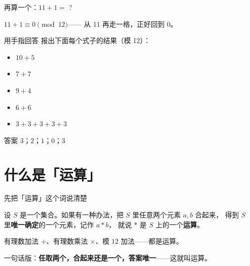 \documentclass[10pt]{beamer}
\begin{document}
\begin{frame}{再算一个：\(11+1=\) ?}
  \pause
  \begin{center}
    {\large \(11+1\equiv 0 \pmod{12}\)}\quad —— 从 11 再走一格，正好回到 0。
  \end{center}
\end{frame}

\begin{frame}{用手指回答}
  报出下面每个式子的结果（模 12）：
  \begin{itemize}
    \item \(10+5\)
    \item \(7+7\)
    \item \(9+4\)
    \item \(6+6\)
    \item \(3+3+3+3+3\)
  \end{itemize}
  \pause
  \begin{block}{答案}
    \(3\)；\quad \(2\)；\quad \(1\)；\quad \(0\)；\quad \(3\)
  \end{block}
\end{frame}

\section{什么是「运算」}

\begin{frame}{先把「运算」这个词说清楚}
  \begin{definition}[运算]
    设 \(S\) 是一个集合。如果有一种办法，把 \(S\) 里任意两个元素 \(a,b\) 合起来，
    得到 \(S\) 里\textbf{唯一确定}的一个元素，记作 \(a*b\)，
    就说 \(*\) 是 \(S\) 上的一个\textbf{运算}。
  \end{definition}
  \pause
  \begin{example}
    有理数加法 \(+\)、有理数乘法 \(\times\)、模 \(12\) 加法——都是运算。
  \end{example}
  \pause
  \begin{center}
    {\large 一句话版：\textbf{任取两个，合起来还是一个，答案唯一}——这就叫运算。}
  \end{center}
\end{frame}
\end{document}
